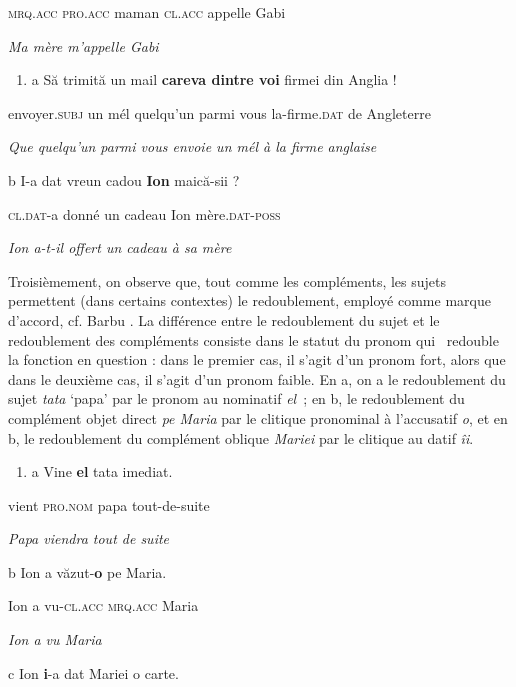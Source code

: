     \textsc{mrq.acc  pro.acc } maman  \textsc{cl.acc}  appelle  Gabi 

    \textit{Ma mère m'appelle Gabi}


\begin{enumerate}
\item \label{bkm:Ref299317110}a  Să trimită  un  mail  \textbf{careva  dintre  voi}  firmei  din  Anglia !


\end{enumerate}
  envoyer.\textsc{subj}  un  mél  quelqu'un  parmi  vous  la-firme.\textsc{dat}  de  Angleterre

\textit{Que quelqu'un parmi vous envoie un mél à la firme anglaise}  

  b  I-a  dat  vreun  cadou  \textbf{Ion}  maică-sii ?

    \textsc{cl.dat}-a  donné  un  cadeau  Ion  mère.\textsc{dat-poss} 

  \textit{Ion a-t-il offert un cadeau à sa mère}

Troisièmement, on observe que, tout comme les compléments, les sujets permettent (dans certains contextes) le redoublement, employé comme marque d'accord, cf. Barbu \citet{Mititelu2003}. La différence entre le redoublement du sujet et le redoublement des compléments consiste dans le statut du pronom qui {\guillemotleft}~redouble~{\guillemotright} la fonction en question : dans le premier cas, il s'agit d'un pronom fort, alors que dans le deuxième cas, il s'agit d'un pronom faible. En a, on a le redoublement du sujet \textit{tata} `papa' par le pronom au nominatif \textit{el~}; en b, le redoublement du complément objet direct \textit{pe Maria} par le clitique pronominal à l'accusatif \textit{o}, et en b, le redoublement du complément oblique \textit{Mariei} par le clitique au datif \textit{îi}.


\begin{enumerate}
\item \label{bkm:Ref299317634}a  Vine  \textbf{el}  tata  imediat. 


\end{enumerate}
vient\textsc{  pro.nom}  papa  tout-de-suite

\textit{  Papa viendra tout de suite}  

  b  Ion  a  văzut-\textbf{o}  pe  Maria.

    Ion  a  vu-\textsc{cl.acc  mrq.acc}  Maria

    \textit{Ion a vu Maria}

  c  Ion  \textbf{i}-a  dat  Mariei  o  carte. 

